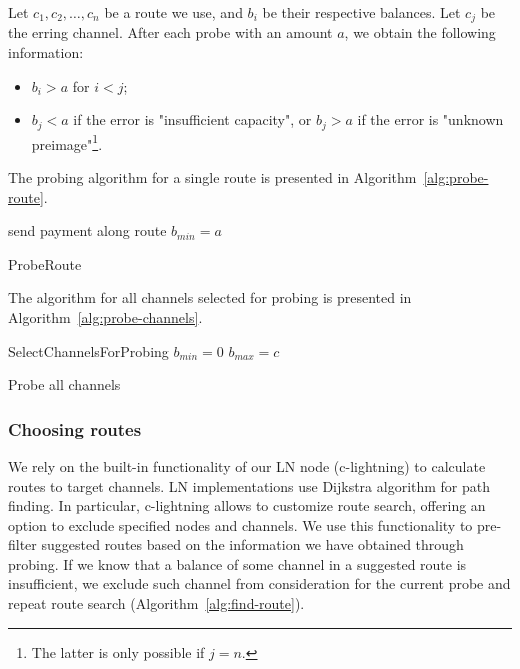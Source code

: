 Let $c_1, c_2, \dots, c_n$ be a route we use, and $b_i$ be their respective balances.
Let $c_j$ be the erring channel.
After each probe with an amount $a$, we obtain the following information: 
\begin{itemize}
	\item $b_i > a$ for $i<j$;
	\item $b_j < a$ if the error is "insufficient capacity", or $b_j > a$ if the error is "unknown preimage"\footnote{The latter is only possible if $j=n$.}.
\end{itemize}

The probing algorithm for a single route is presented in Algorithm~\ref{alg:probe-route}.

\begin{algorithm}
	send payment along route\;
	 {
		$b_{min} = a$\;
	}
	\caption{ProbeRoute}
	\label{alg:probe-route}
\end{algorithm}

The algorithm for all channels selected for probing is presented in Algorithm~\ref{alg:probe-channels}.

\begin{algorithm}
	SelectChannelsForProbing\;
	 {	
		$b_{min} = 0$\;
		$b_{max} = c$\;
		 {
		}
	}
	\caption{Probe all channels}
	\label{alg:probe-channels}
\end{algorithm}


\subsubsection{Choosing routes}
We rely on the built-in functionality of our LN node (c-lightning) to calculate routes to target channels.
LN implementations use Dijkstra algorithm for path finding.
In particular, c-lightning allows to customize route search, offering an option to exclude specified nodes and channels.
We use this functionality to pre-filter suggested routes based on the information we have obtained through probing.
If we know that a balance of some channel in a suggested route is insufficient, we exclude such channel from consideration for the current probe and repeat route search (Algorithm~\ref{alg:find-route}).

